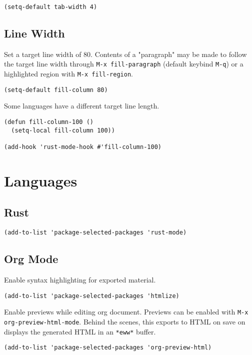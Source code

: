 \documentclass[11pt]{article}
\begin{document}
\begin{verbatim}
(setq-default tab-width 4)
\end{verbatim}
\subsection{Line Width}
\label{sec:orgb96bf2f}

Set a target line width of 80. Contents of a "paragraph" may be made to follow
the target line width through \texttt{M-x fill-paragraph} (default keybind \texttt{M-q}) or a
highlighted region with \texttt{M-x fill-region}.

\begin{verbatim}
(setq-default fill-column 80)
\end{verbatim}

Some languages have a different target line length.

\begin{verbatim}
(defun fill-column-100 ()
  (setq-local fill-column 100))

(add-hook 'rust-mode-hook #'fill-column-100)
\end{verbatim}
\section{Languages}
\label{sec:orgd178f44}

\subsection{Rust}
\label{sec:org36da65a}

\begin{verbatim}
(add-to-list 'package-selected-packages 'rust-mode)
\end{verbatim}
\subsection{Org Mode}
\label{sec:orgcb82ac1}

Enable syntax highlighting for exported material.

\begin{verbatim}
(add-to-list 'package-selected-packages 'htmlize)
\end{verbatim}

Enable previews while editing org document. Previews can be enabled with \texttt{M-x
org-preview-html-mode}. Behind the scenes, this exports to HTML on save on
displays the generated HTML in an \texttt{*eww*} buffer.

\begin{verbatim}
(add-to-list 'package-selected-packages 'org-preview-html)
\end{verbatim}
\end{document}
